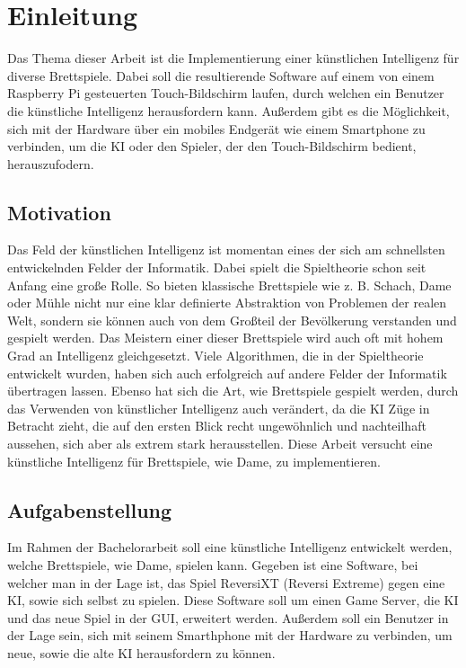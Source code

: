 \documentclass[12pt,a4paper,bibliography=totocnumbered,listof=totocnumbered]{article}
\begin{document}
\section{Einleitung}
Das Thema dieser Arbeit ist die Implementierung einer künstlichen Intelligenz für diverse
Brettspiele. Dabei soll die resultierende Software auf einem von einem Raspberry Pi gesteuerten 
Touch-Bildschirm laufen, durch welchen ein Benutzer die künstliche Intelligenz herausfordern kann.
Außerdem gibt es die Möglichkeit, sich mit der Hardware über ein mobiles Endgerät wie einem 
Smartphone zu verbinden, um die KI oder den Spieler, der den Touch-Bildschirm bedient,
herauszufodern.

\subsection{Motivation}
Das Feld der künstlichen Intelligenz ist momentan eines der sich am schnellsten 
entwickelnden Felder der Informatik. Dabei spielt die Spieltheorie schon seit Anfang eine 
große Rolle. So bieten klassische Brettspiele wie z. B. Schach, Dame oder Mühle nicht nur 
eine klar definierte Abstraktion von Problemen der realen Welt, sondern sie können auch von
dem Großteil der Bevölkerung verstanden und gespielt werden. Das Meistern einer dieser 
Brettspiele wird auch oft mit hohem Grad an Intelligenz gleichgesetzt. Viele Algorithmen,
die in der Spieltheorie entwickelt wurden, haben sich auch erfolgreich auf andere Felder
der Informatik übertragen lassen. Ebenso hat sich die Art, wie Brettspiele gespielt werden, 
durch das Verwenden von künstlicher Intelligenz auch verändert, da die KI Züge in Betracht 
zieht, die auf den ersten Blick recht ungewöhnlich und nachteilhaft aussehen, sich aber als 
extrem stark herausstellen. Diese Arbeit versucht eine künstliche Intelligenz für 
Brettspiele, wie Dame, zu implementieren.

\subsection{Aufgabenstellung}
Im Rahmen der Bachelorarbeit soll eine künstliche Intelligenz entwickelt werden, welche 
Brettspiele, wie Dame, spielen kann. Gegeben ist eine Software, bei welcher man in der Lage ist,
das Spiel ReversiXT (Reversi Extreme) gegen eine KI, sowie sich selbst zu spielen. Diese 
Software soll um einen Game Server, die KI und das neue Spiel in der GUI, erweitert werden.
Außerdem soll ein Benutzer in der Lage sein, sich mit seinem Smarthphone mit der Hardware zu 
verbinden, um neue, sowie die alte KI herausfordern zu können.
\end{document}
